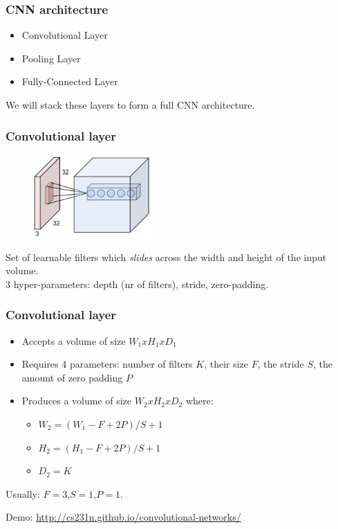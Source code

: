 \begin{frame}
	\frametitle{CNN architecture}

	\begin{itemize}
		\item Convolutional Layer
		\item Pooling Layer
		\item Fully-Connected Layer
	\end{itemize}

	We will stack these layers to form a full CNN architecture.

\end{frame}

\begin{frame}
	\frametitle{Convolutional layer}

	\begin{figure}
       		\includegraphics[width=0.4\textwidth]{Pics/depthcol}
      	\end{figure}

	Set of learnable filters which \textit{slides} across the width and height of the input volume.\\
	3 hyper-parameters: depth (nr of filters), stride, zero-padding.

\end{frame}

\begin{frame}
        \frametitle{Convolutional layer}

	\begin{itemize}
		\item Accepts a volume of size $W_1xH_1xD_1$
		\item Requires 4 parameters: number of filters $K$, their size $F$, the stride $S$, the amount of zero padding $P$
		\item Produces a volume of size $W_2xH_2xD_2$ where:
		\begin{itemize}
			\item $W_2 = (W_1 - F +2P)/S+1$
			\item $H_2 = (H_1 - F +2P)/S+1$
			\item $D_2 = K$
		\end{itemize}
	\end{itemize}

	Usually: $F=3$,$S=1$,$P=1$.

	Demo: \url{http://cs231n.github.io/convolutional-networks/}

\end{frame}

